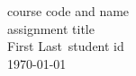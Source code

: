 \documentclass[finnish,12pt,a4paper,pdftex]{article}
\newcommand{\nimi}[0] {First Last}
\newcommand{\opnro}[0] {student id}
\newcommand{\kurssi}[0] {course code and name}
\newcommand{\tehtava}[0] {assignment title}
\begin{document}
\thispagestyle{empty}
\begin{center}
    \LARGE{\kurssi}\\[3 cm]
    \Large{\tehtava}\\[3 cm]
    \small{\nimi\ \opnro}\\[9 cm]
    \today
\end{center}

\newpage
\setcounter{page}{1}
\pagestyle{fancy}

\end{document}
